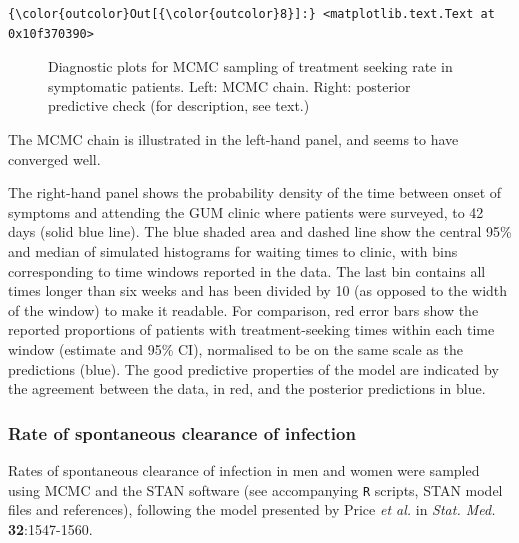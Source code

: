 \documentclass{article}
\begin{document}
    \begin{footnotesize}
            \begin{Verbatim}[commandchars=\\\{\}]
{\color{outcolor}Out[{\color{outcolor}8}]:} <matplotlib.text.Text at 0x10f370390>
\end{Verbatim}
    \end{footnotesize}
        
    \begin{figure}
        \begin{center}\end{center}
        \caption{Diagnostic plots for MCMC sampling of treatment seeking rate in symptomatic patients. Left: MCMC chain. Right: posterior predictive check (for description, see text.)}
        \label{fig:trt_seek_diagnostic}
    \end{figure}
    
    The MCMC chain is illustrated in the left-hand panel, and seems to have
converged well.

The right-hand panel shows the probability density of the time between
onset of symptoms and attending the GUM clinic where patients were
surveyed, to 42 days (solid blue line). The blue shaded area and dashed
line show the central 95\% and median of simulated histograms for
waiting times to clinic, with bins corresponding to time windows
reported in the data. The last bin contains all times longer than six
weeks and has been divided by 10 (as opposed to the width of the window)
to make it readable. For comparison, red error bars show the reported
proportions of patients with treatment-seeking times within each time
window (estimate and 95\% CI), normalised to be on the same scale as the
predictions (blue). The good predictive properties of the model are
indicated by the agreement between the data, in red, and the posterior
predictions in blue.

    \subsubsection{Rate of spontaneous clearance of
infection}\label{rate-of-spontaneous-clearance-of-infection}

Rates of spontaneous clearance of infection in men and women were
sampled using MCMC and the STAN software (see accompanying \texttt{R}
scripts, STAN model files and references), following the model presented
by Price \emph{et al.} in \emph{Stat. Med.} \textbf{32}:1547-1560.
\end{document}
